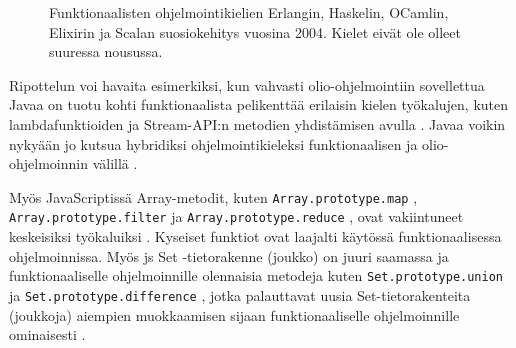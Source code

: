 \begin{figure}[htbp]
    \datatable
    \pgfplotstablegetrowsof{\datatable}
    \centering
    \caption{Funktionaalisten ohjelmointikielien Erlangin, Haskelin, OCamlin, Elixirin ja Scalan suosiokehitys vuosina 2004. Kielet eivät ole olleet suuressa nousussa. \citep{fplanggoogletrend}}
    \label{fig:fplangpopularity}
\end{figure}


Ripottelun voi havaita esimerkiksi, kun vahvasti olio-ohjelmointiin sovellettua Javaa on tuotu kohti funktionaalista pelikenttää erilaisin kielen työkalujen, kuten lambdafunktioiden ja Stream-API:n metodien yhdistämisen avulla \cite{oracle_function_package,oracle_stream_api}.
Javaa voikin nykyään jo kutsua hybridiksi ohjelmointikieleksi funktionaalisen ja olio-ohjelmoinnin välillä \cite[50]{sundstrom_java_fp}.

Myös JavaScriptissä Array-metodit, kuten \texttt{Array.prototype.map} \cite{mdn_array_map}, \texttt{Array.prototype.filter} \cite{mdn_array_filter} ja \texttt{Array.prototype.reduce} \cite{mdn_array_reduce}, ovat vakiintuneet keskeisiksi työkaluiksi \cite{vakil2016,8_must_know_array_methods}. Kyseiset funktiot ovat laajalti käytössä funktionaalisessa ohjelmoinnissa. Myös \gls{js} Set -tietorakenne (joukko) on juuri saamassa  ja funktionaaliselle ohjelmoinnille olennaisia metodeja kuten \texttt{Set.prototype.union} \cite{mdn_set_union} ja \texttt{Set.prototype.difference} \cite{mdn_set_intersection}, jotka palauttavat uusia Set-tietorakenteita (joukkoja) aiempien muokkaamisen sijaan funktionaaliselle ohjelmoinnille ominaisesti \cite{mdn_set_methods}.

